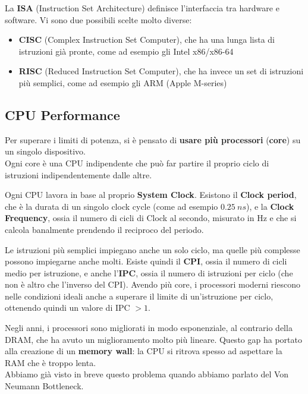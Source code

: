 \documentclass[11pt, a4paper, titlepage, oneside]{scrbook}
\begin{document}
\begin{Definizione}
\label{def-ISA}
La \textbf{ISA} (Instruction Set Architecture) definisce l'interfaccia tra hardware e software. Vi sono due possibili scelte molto diverse:
\begin{itemize}
    \item \textbf{CISC} (Complex Instruction Set Computer), che ha una lunga lista di istruzioni già pronte, come ad esempio gli Intel x86/x86-64
    \item \textbf{RISC} (Reduced Instruction Set Computer), che ha invece un set di istruzioni più semplici, come ad esempio gli ARM (Apple M-series)
\end{itemize}
\end{Definizione}

\subsection{CPU Performance}

\begin{Definizione}
\label{def-processori-multicore}
Per superare i limiti di potenza, si è pensato di \textbf{usare più processori} (\textbf{core}) su un singolo dispositivo. \\
Ogni core è una CPU indipendente che può far partire il proprio ciclo di istruzioni indipendentemente dalle altre.
\end{Definizione}

\begin{Definizione}[Clock]
\label{def-clock}
Ogni CPU lavora in base al proprio \textbf{System Clock}. Esistono il \textbf{Clock period}, che è la durata di un singolo clock cycle (come ad esempio $\SI{0.25}{ns}$), e la \textbf{Clock Frequency}, ossia il numero di cicli di Clock al secondo, misurato in Hz e che si calcola banalmente prendendo il reciproco del periodo.
\end{Definizione}

Le istruzioni più semplici impiegano anche un solo ciclo, ma quelle più complesse possono impiegarne anche molti. Esiste quindi il \textbf{CPI}, ossia il numero di cicli medio per istruzione, e anche l'\textbf{IPC}, ossia il numero di istruzioni per ciclo (che non è altro che l'inverso del CPI). Avendo più core, i processori moderni riescono nelle condizioni ideali anche a superare il limite di un'istruzione per ciclo, ottenendo quindi un valore di IPC $>1$.

\begin{Osservazione}
\label{oss-memory-wallò}
Negli anni, i processori sono migliorati in modo esponenziale, al contrario della DRAM, che ha avuto un miglioramento molto più lineare. Questo gap ha portato alla creazione di un \textbf{memory wall}: la CPU si ritrova spesso ad aspettare la RAM che è troppo lenta. \\
Abbiamo già visto in breve questo problema quando abbiamo parlato del Von Neumann Bottleneck. 
\end{Osservazione}
\end{document}
